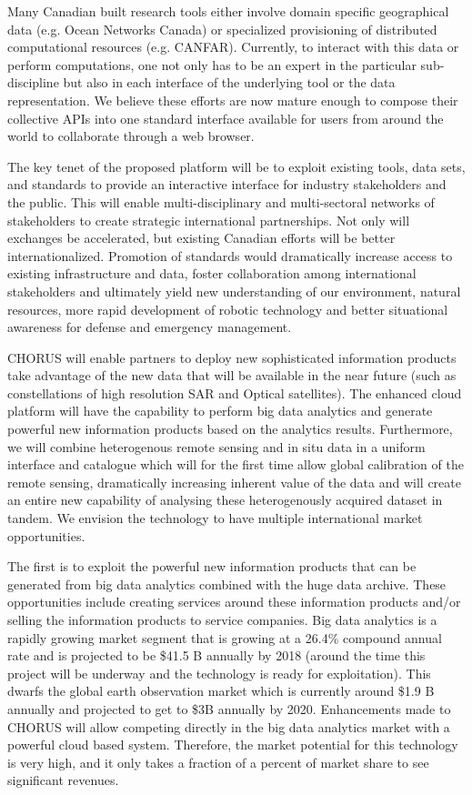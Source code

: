 
Many Canadian built research tools either involve domain specific
geographical data (e.g. Ocean Networks Canada) or specialized
provisioning of distributed computational resources
(e.g. CANFAR). Currently, to interact with this data or perform
computations, one not only has to be an expert in the particular
sub-discipline but also in each interface of the underlying tool or
the data representation.  We believe these efforts are now mature
enough to compose their collective APIs into one standard interface
available for users from around the world to collaborate through a web
browser.

The key tenet of the proposed platform will be to exploit existing
tools, data sets, and standards to provide an interactive interface
for industry stakeholders and the public.  This will enable
multi-disciplinary and multi-sectoral networks of stakeholders to
create strategic international partnerships. Not only will exchanges
be accelerated, but existing Canadian efforts will be better
internationalized.  Promotion of standards would dramatically increase
access to existing infrastructure and data, foster collaboration among
international stakeholders and ultimately yield new understanding of
our environment, natural resources, more rapid development of robotic
technology and better situational awareness for defense and emergency
management.

CHORUS will enable partners to deploy new sophisticated information
products take advantage of the new data that will be available in the
near future (such as constellations of high resolution SAR and Optical
satellites).  The enhanced cloud platform will have the capability to
perform big data analytics and generate powerful new information
products based on the analytics results.  Furthermore, we will combine
heterogenous remote sensing and in situ data in a uniform interface
and catalogue which will for the first time allow global calibration
of the remote sensing, dramatically increasing inherent value of the
data and will create an entire new capability of analysing these
heterogenously acquired dataset in tandem.  We envision the technology
to have multiple international market opportunities.

The first is to exploit the powerful new information products that can
be generated from big data analytics combined with the huge data
archive. These opportunities include creating services around these
information products and/or selling the information products to
service companies.  Big data analytics is a rapidly growing market
segment that is growing at a 26.4\% compound annual rate and is
projected to be \$41.5 B annually by 2018 (around the time this project
will be underway and the technology is ready for exploitation). This
dwarfs the global earth observation market which is currently around
\$1.9 B annually and projected to get to \$3B annually by 2020.
Enhancements made to CHORUS will allow competing directly in the big
data analytics market with a powerful cloud based system. Therefore,
the market potential for this technology is very high, and it only
takes a fraction of a percent of market share to see significant
revenues.

